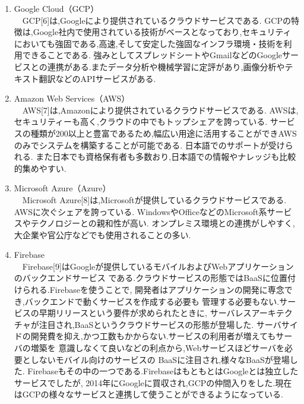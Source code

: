 \begin{enumerate}
  \item Google Cloud（GCP） \\
  　GCP[6]は,Googleにより提供されているクラウドサービスである.
  GCPの特徴は,Google社内で使用されている技術がベースとなっており,セキュリティにおいても強固である,高速,そして安定した強固なインフラ環境・技術を利用できることである.
  強みとしてスプレッドシートやGmailなどのGoogleサービスとの連携がある.またデータ分析や機械学習に定評があり,画像分析やテキスト翻訳などのAPIサービスがある.\\

  \item Amazon Web Services（AWS） \\
  　AWS[7]は,Amazonにより提供されているクラウドサービスである.
  AWSは,セキュリティーも高く,クラウドの中でもトップシェアを誇っている.
  サービスの種類が200以上と豊富であるため,幅広い用途に活用することができAWSのみでシステムを構築することが可能である.
  日本語でのサポートが受けられる.
  また日本でも資格保有者も多数おり,日本語での情報やナレッジも比較的集めやすい.
  \\

  \item Microsoft Azure（Azure） \\
  　Microsoft Azure[8]は,Microsoftが提供しているクラウドサービスである.
  AWSに次ぐシェアを誇っている.
  WindowsやOfficeなどのMicrosoft系サービスやテクノロジーとの親和性が高い.
  オンプレミス環境との連携がしやすく,大企業や官公庁などでも使用されることの多い.\\

  \item  Firebase \\
  　Firebase[9]はGoogleが提供しているモバイルおよびWebアプリケーションのバックエンドサービス
  である.クラウドサービスの形態ではBaaSに位置付けられる.Firebaseを使うことで,
  開発者はアプリケーションの開発に専念でき,バックエンドで動くサービスを作成する必要も
  管理する必要もない.サービスの早期リリースという要件が求められたときに,
  サーバレスアーキテクチャが注目され,BaaSというクラウドサービスの形態が登場した.
  サーバサイドの開発費を抑え,かつ工数もかからない.サービスの利用者が増えてもサーバの増築を
  意識しなくて良いなどの利点から,Webサービスほどサーバを必要としないモバイル向けのサービスの
  BaaSに注目され,様々なBaaSが登場した.
  Firebaseもその中の一つである.FirebaseはもともとはGoogleとは独立したサービスでしたが,
  2014年にGoogleに買収され,GCPの仲間入りをした.現在はGCPの様々なサービスと連携して使うことができるようになっている.
\end{enumerate}

